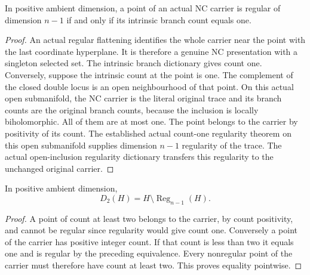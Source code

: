 \begin{lemma}
\label{hir:general-nc-one-branch-iff-regular}
\leanok
{}
In positive ambient dimension, a point of an actual NC carrier is
regular of dimension $n-1$ if and only if its intrinsic branch count
equals one.
\end{lemma}
\begin{proof}
An actual regular flattening identifies the whole carrier near the
point with the last coordinate hyperplane. It is therefore a genuine
NC presentation with a singleton selected set. The intrinsic branch
dictionary gives count one. Conversely, suppose the intrinsic count
at the point is one. The complement of the closed double locus is an
open neighbourhood of that point. On this actual open submanifold,
the NC carrier is the literal original trace and its branch counts
are the original branch counts, because the inclusion is locally
biholomorphic. All of them are at most one. The point belongs to the
carrier by positivity of its count. The established actual count-one
regularity theorem on this open submanifold supplies dimension
$n-1$ regularity of the trace. The actual open-inclusion regularity
dictionary transfers this regularity to the unchanged original carrier.
\end{proof}

\begin{lemma}
\label{hir:general-nc-double-locus-eq-singular-locus}
\leanok
{}
In positive ambient dimension,
\[
 D_2(H)=H\setminus\operatorname{Reg}_{n-1}(H).
\]
\end{lemma}
\begin{proof}
A point of count at least two belongs to the carrier, by count
positivity, and cannot be regular since regularity would give count
one. Conversely a point of the carrier has positive integer count.
If that count is less than two it equals one and is regular by the
preceding equivalence. Every nonregular point of the carrier must
therefore have count at least two. This proves equality pointwise.
\end{proof}

